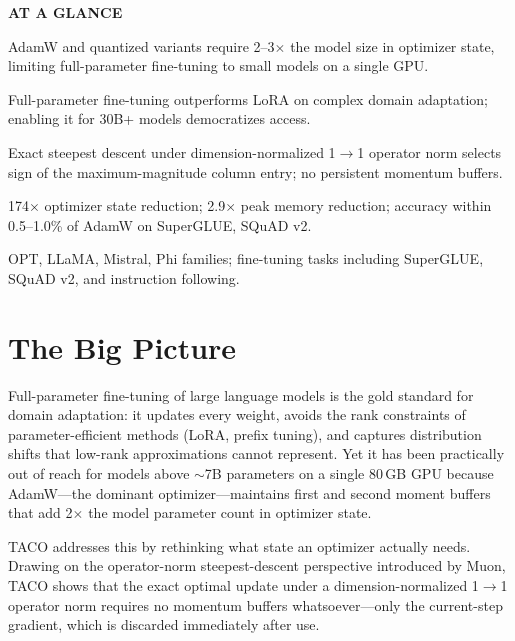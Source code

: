 \documentclass[10pt,twocolumn]{article}
\begin{document}
\begin{mdframed}[backgroundcolor=boxgray,linecolor=rulered,linewidth=1pt,
    innerleftmargin=6pt,innerrightmargin=6pt,
    innertopmargin=6pt,innerbottommargin=6pt]
\textbf{\small AT A GLANCE}\par\vspace{4pt}
\begin{description}[leftmargin=0pt,labelsep=4pt,itemsep=2pt,parsep=0pt,
    font=\small\bfseries]
  \item[Problem:] AdamW and quantized variants require 2--3$\times$ the model size
    in optimizer state, limiting full-parameter fine-tuning to small models on
    a single GPU.
  \item[Why it matters:] Full-parameter fine-tuning outperforms LoRA on complex
    domain adaptation; enabling it for 30B+ models democratizes access.
  \item[Method:] Exact steepest descent under dimension-normalized 1$\to$1 operator
    norm selects sign of the maximum-magnitude column entry; no persistent momentum
    buffers.
  \item[Result:] 174$\times$ optimizer state reduction; 2.9$\times$ peak memory
    reduction; accuracy within 0.5--1.0\% of AdamW on SuperGLUE, SQuAD v2.
  \item[Evidence:] OPT, LLaMA, Mistral, Phi families; fine-tuning tasks including
    SuperGLUE, SQuAD v2, and instruction following.
\end{description}
\end{mdframed}

\section{The Big Picture}

Full-parameter fine-tuning of large language models is the gold standard for
domain adaptation: it updates every weight, avoids the rank constraints of
parameter-efficient methods (LoRA, prefix tuning), and captures distribution
shifts that low-rank approximations cannot represent. Yet it has been practically
out of reach for models above $\sim$7B parameters on a single 80\,GB GPU because
AdamW---the dominant optimizer---maintains first and second moment buffers that
add 2$\times$ the model parameter count in optimizer state.

TACO addresses this by rethinking what state an optimizer actually needs.
Drawing on the operator-norm steepest-descent perspective introduced by Muon,
TACO shows that the exact optimal update under a dimension-normalized 1$\to$1
operator norm requires no momentum buffers whatsoever---only the current-step
gradient, which is discarded immediately after use.
\end{document}
